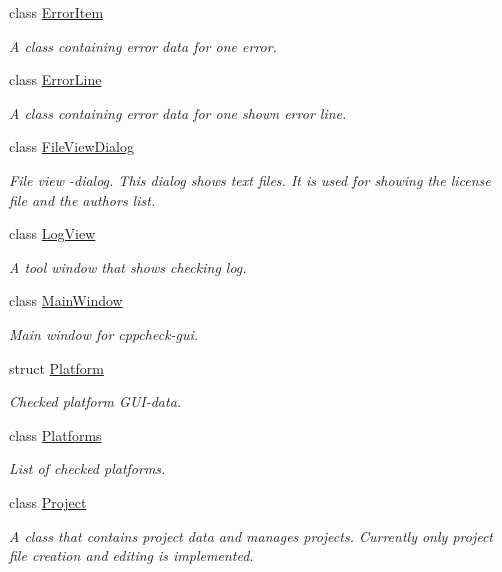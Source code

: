 \begin{DoxyCompactItemize}
class \hyperlink{class_error_item}{Error\-Item}
\begin{DoxyCompactList}\small\item\em A class containing error data for one error. \end{DoxyCompactList}\item 
class \hyperlink{class_error_line}{Error\-Line}
\begin{DoxyCompactList}\small\item\em A class containing error data for one shown error line. \end{DoxyCompactList}\item 
class \hyperlink{class_file_view_dialog}{File\-View\-Dialog}
\begin{DoxyCompactList}\small\item\em File view -\/dialog. This dialog shows text files. It is used for showing the license file and the authors list. \end{DoxyCompactList}\item 
class \hyperlink{class_log_view}{Log\-View}
\begin{DoxyCompactList}\small\item\em A tool window that shows checking log. \end{DoxyCompactList}\item 
class \hyperlink{class_main_window}{Main\-Window}
\begin{DoxyCompactList}\small\item\em Main window for cppcheck-\/gui. \end{DoxyCompactList}\item 
struct \hyperlink{struct_platform}{Platform}
\begin{DoxyCompactList}\small\item\em Checked platform G\-U\-I-\/data. \end{DoxyCompactList}\item 
class \hyperlink{class_platforms}{Platforms}
\begin{DoxyCompactList}\small\item\em List of checked platforms. \end{DoxyCompactList}\item 
class \hyperlink{class_project}{Project}
\begin{DoxyCompactList}\small\item\em A class that contains project data and manages projects. Currently only project file creation and editing is implemented. \end{DoxyCompactList}\item 

\end{DoxyCompactItemize}
